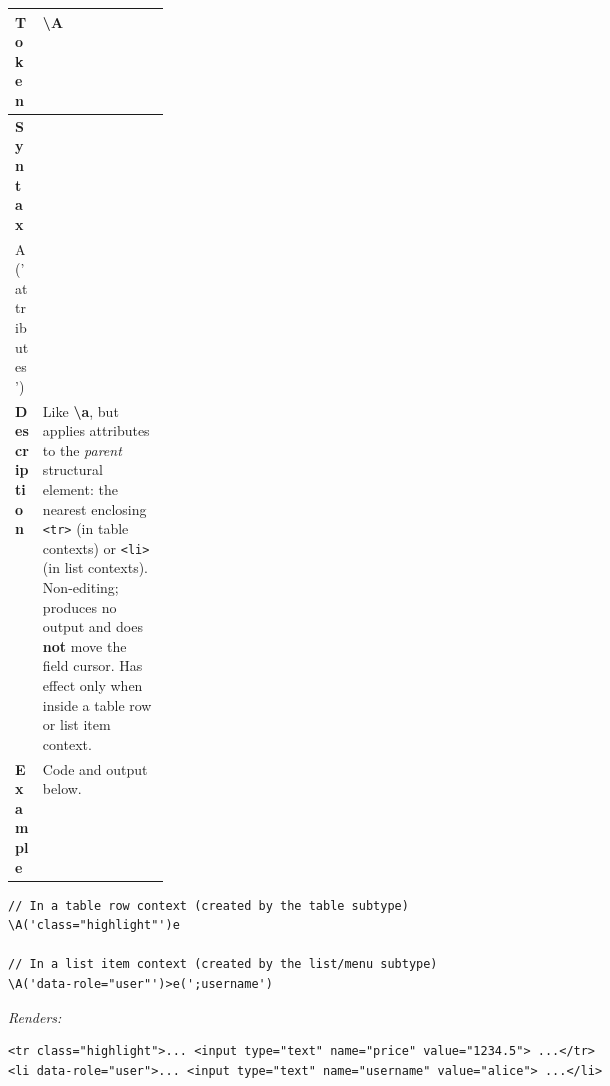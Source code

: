 \begin{tcolorbox}[colback=white!0,colframe=black!15,boxrule=0.5pt,arc=2pt]
{\small{}%
\begin{tabularx}{\linewidth}{@{}p{0.18\linewidth} X@{}}
\textbf{Token} & \textbf{\textbackslash A} \\
\hline
\textbf{Syntax} & \wballsyn{\\A('attributes')} \\
\hline
\textbf{Description} & Like \textbf{\textbackslash a}, but applies attributes to the \emph{parent} structural element: the nearest enclosing \texttt{<tr>} (in table contexts) or \texttt{<li>} (in list contexts). Non-editing; produces no output and does \textbf{not} move the field cursor. Has effect only when inside a table row or list item context. \\
\hline
\textbf{Example} & Code and output below. \\
\end{tabularx}}

\vspace{0.3em}
\lstset{language=WBLL}
\begin{lstlisting}
// In a table row context (created by the table subtype)
\A('class="highlight"')e

// In a list item context (created by the list/menu subtype)
\A('data-role="user"')>e(';username')
\end{lstlisting}
\textit{Renders:}
\lstset{language=HTML}
\begin{lstlisting}
<tr class="highlight">... <input type="text" name="price" value="1234.5"> ...</tr>
<li data-role="user">... <input type="text" name="username" value="alice"> ...</li>
\end{lstlisting}
\end{tcolorbox}
